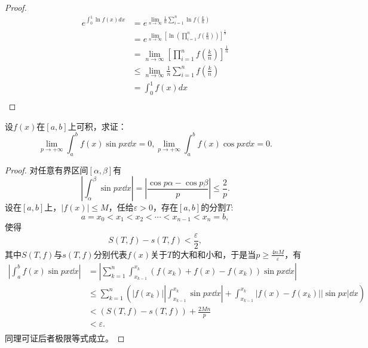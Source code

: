 \begin{proof}
  \begin{equation*}
  \begin{aligned}
  e^{\int_0^1\ln f(x)dx}&=\displaystyle e^{\lim_{n\rightarrow\infty}\frac1n\sum_{i=1}^n\ln f(\frac kn)}\\
  &=e^{\lim_{n\rightarrow\infty}[\ln(\prod_{i=1}^nf(\frac kn))]^{\frac1n}}\\
  &=\lim_{n\rightarrow\infty}[\prod_{i=1}^nf(\frac kn)]^{\frac1n}\\
  &\leq\lim_{n\rightarrow\infty}\frac1n\sum_{i=1}^nf(\frac kn)\\
  &=\int_0^1f(x)dx\\
  \end{aligned}
  \end{equation*}
\end{proof}

\begin{example}
 设$f(x)$在$[a,b]$上可积，求证：$$\displaystyle\lim_{p\rightarrow+\infty}\int_a^bf(x)\sin px\dd x=0,\lim_{p\rightarrow+\infty}\int_a^bf(x)\cos px\dd x=0.$$
\end{example}

\begin{proof}
 对任意有界区间$[\alpha,\beta]$有$$|\int_{\alpha}^{\beta}\sin px\dd x|=|\frac{\cos p\alpha-\cos p\beta}{p}|\leq\frac{2}{p}.$$
设在$[a,b]$上，$|f(x)|\leq M$，任给$\varepsilon>0$，存在$[a,b]$的分割$T$:
$$a=x_0<x_1<x_2<\cdots<x_{n-1}<x_n=b,$$
使得
$$S(T,f)-s(T,f)<\frac{\varepsilon}{2},$$
其中$S(T,f)$与$s(T,f)$分别代表$f(x)$关于$T$的大和和小和，于是当$p\geq\frac{4nM}{\varepsilon}$，有
\begin{align*}
|\int_a^bf(x)\sin px\dd x|&=
|\sum_{k=1}^n\int_{x_{k-1}}^{x_k}(f(x_k)+f(x)-f(x_k))\sin px\dd x|\\
&\leq\sum_{k=1}^n(|f(x_k)||\int_{x_{k-1}}^{x_k}\sin px\dd x|+\int_{x_{k-1}}^{x_k}|f(x)-f(x_k)||\sin px|\dd x)\\
&<(S(T,f)-s(T,f))+\frac{2Mn}{p}\\
&<\varepsilon.\\
\end{align*}
同理可证后者极限等式成立。
\end{proof}

